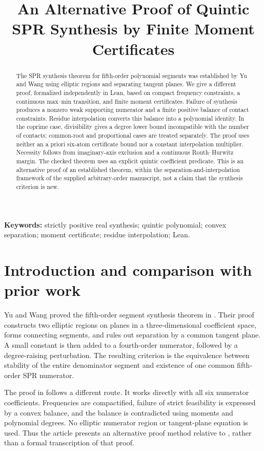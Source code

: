 \documentclass[11pt]{article}
\title{An Alternative Proof of Quintic SPR Synthesis by Finite Moment Certificates}
\begin{document}
\maketitle
\begin{abstract}
The SPR synthesis theorem for fifth-order polynomial segments was established by Yu and Wang using elliptic regions and separating tangent planes. We give a different proof, formalized independently in Lean, based on compact frequency constraints, a continuous max--min transition, and finite moment certificates. Failure of synthesis produces a nonzero weak supporting numerator and a finite positive balance of contact constraints. Residue interpolation converts this balance into a polynomial identity. In the coprime case, divisibility gives a degree lower bound incompatible with the number of contacts; common-root and proportional cases are treated separately. The proof uses neither an a priori six-atom certificate bound nor a constant interpolation multiplier. Necessity follows from imaginary-axis exclusion and a continuous Routh--Hurwitz margin. The checked theorem uses an explicit quintic coefficient predicate. This is an alternative proof of an established theorem, within the separation-and-interpolation framework of the supplied arbitrary-order manuscript, not a claim that the synthesis criterion is new.
\end{abstract}
\noindent\textbf{Keywords:} strictly positive real synthesis; quintic polynomial; convex separation; moment certificate; residue interpolation; Lean.

\section{Introduction and comparison with prior work}
Yu and Wang proved the fifth-order segment synthesis theorem in \cite{yuWang2001Quintic}. Their proof constructs two elliptic regions on planes in a three-dimensional coefficient space, forms connecting segments, and rules out separation by a common tangent plane. A small constant is then added to a fourth-order numerator, followed by a degree-raising perturbation. The resulting criterion is the equivalence between stability of the entire denominator segment and existence of one common fifth-order SPR numerator.

The proof in  follows a different route. It works directly with all six numerator coefficients. Frequencies are compactified, failure of strict feasibility is expressed by a convex balance, and the balance is contradicted using moments and polynomial degrees. No elliptic numerator region or tangent-plane equation is used. Thus the article presents an alternative proof method relative to \cite{yuWang2001Quintic}, rather than a formal transcription of that proof.
\end{document}
